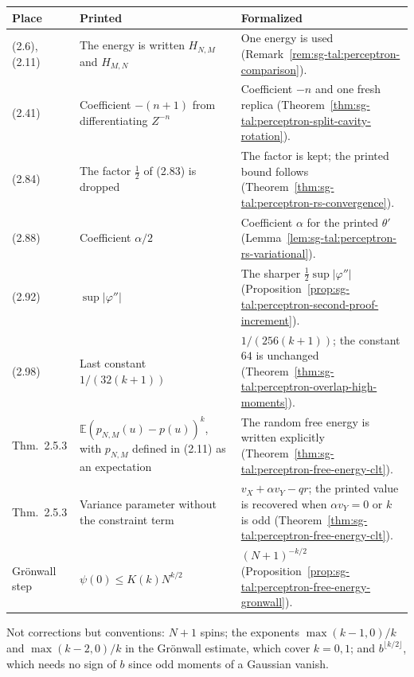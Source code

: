 \begin{remark}\label{rem:sg-tal:perceptron-chapter2-printed-corrections}
\begin{center}
\begin{tabular}{|p{}|p{}|p{}|}
\hline
\textbf{Place} & \textbf{Printed} & \textbf{Formalized} \\
\hline
(2.6), (2.11) & The energy is written $H_{N,M}$ and $H_{M,N}$ & One energy is used
(Remark~\ref{rem:sg-tal:perceptron-comparison}). \\
\hline
(2.41) & Coefficient $-(n+1)$ from differentiating $Z^{-n}$ & Coefficient $-n$ and one fresh replica
(Theorem~\ref{thm:sg-tal:perceptron-split-cavity-rotation}). \\
\hline
(2.84) & The factor $\frac12$ of (2.83) is dropped & The factor is kept; the printed bound follows
(Theorem~\ref{thm:sg-tal:perceptron-rs-convergence}). \\
\hline
(2.88) & Coefficient $\alpha/2$ & Coefficient $\alpha$ for the printed $\theta'$
(Lemma~\ref{lem:sg-tal:perceptron-rs-variational}). \\
\hline
(2.92) & $\sup|\varphi''|$ & The sharper $\frac12\sup|\varphi''|$
(Proposition~\ref{prop:sg-tal:perceptron-second-proof-increment}). \\
\hline
(2.98) & Last constant $1/(32(k+1))$ & $1/(256(k+1))$; the constant $64$ is unchanged
(Theorem~\ref{thm:sg-tal:perceptron-overlap-high-moments}). \\
\hline
Thm.~2.5.3 & $\mathbb E(p_{N,M}(u)-p(u))^k$, with $p_{N,M}$ defined in (2.11) as an expectation & The random free
energy is written explicitly (Theorem~\ref{thm:sg-tal:perceptron-free-energy-clt}). \\
\hline
Thm.~2.5.3 & Variance parameter without the constraint term & $v_X+\alpha v_Y-qr$; the printed value is
recovered when $\alpha v_Y=0$ or $k$ is odd
(Theorem~\ref{thm:sg-tal:perceptron-free-energy-clt}). \\
\hline
Gr\"onwall step & $\psi(0)\le K(k)N^{k/2}$ & $(N+1)^{-k/2}$
(Proposition~\ref{prop:sg-tal:perceptron-free-energy-gronwall}). \\
\hline
\end{tabular}
\end{center}
Not corrections but conventions: $N+1$ spins; the exponents $\max(k-1,0)/k$ and $\max(k-2,0)/k$ in the
Gr\"onwall estimate, which cover $k=0,1$; and $b^{\lfloor k/2\rfloor}$, which needs no sign of $b$ since odd
moments of a Gaussian vanish.
\end{remark}
